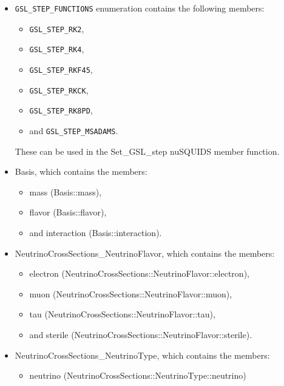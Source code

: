 \documentclass[3p,12pt]{elsarticle}
\newcommand{\ttf}{\ttfamily}
\begin{document}
\begin{itemize}
  \item \lstinline[columns=fixed,breaklines=true]{GSL_STEP_FUNCTIONS} enumeration contains the following members: 
    \begin{itemize}
      \item \lstinline[columns=fixed,breaklines=true]{GSL_STEP_RK2},
      \item \lstinline[columns=fixed,breaklines=true]{GSL_STEP_RK4},
      \item \lstinline[columns=fixed,breaklines=true]{GSL_STEP_RKF45},
      \item \lstinline[columns=fixed,breaklines=true]{GSL_STEP_RKCK},
      \item \lstinline[columns=fixed,breaklines=true]{GSL_STEP_RK8PD},
      \item and \lstinline[columns=fixed,breaklines=true]{GSL_STEP_MSADAMS}.
    \end{itemize}
    These can be used in the {\ttf Set\_GSL\_step} {\ttf nuSQUIDS}  member function.
  \item {\ttf Basis}, which contains the members:
    \begin{itemize}
      \item {\ttf mass} ({\ttf Basis::mass}),
      \item {\ttf flavor} ({\ttf Basis::flavor}),
      \item and {\ttf interaction} ({\ttf Basis::interaction}).
    \end{itemize}
  \item {\ttf NeutrinoCrossSections\_NeutrinoFlavor}, which contains the members:
    \begin{itemize} 
      \item {\ttf electron} ({\ttf NeutrinoCrossSections::NeutrinoFlavor::electron}),
      \item {\ttf muon} ({\ttf NeutrinoCrossSections::NeutrinoFlavor::muon}),
      \item {\ttf tau} ({\ttf NeutrinoCrossSections::NeutrinoFlavor::tau}),
      \item and {\ttf sterile} ({\ttf NeutrinoCrossSections::NeutrinoFlavor::sterile}).
    \end{itemize}
  \item {\ttf NeutrinoCrossSections\_NeutrinoType}, which contains the members:
    \begin{itemize} 
      \item {\ttf neutrino} ({\ttf NeutrinoCrossSections::NeutrinoType::neutrino})

\end{itemize}
\end{itemize}
\end{document}
